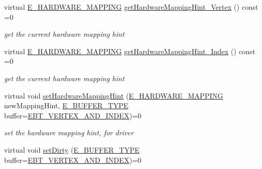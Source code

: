 \begin{DoxyCompactItemize}
virtual \hyperlink{namespaceirr_1_1scene_ac7d8ee8d77da75f2580bb9bb17231c27}{E\+\_\+\+H\+A\+R\+D\+W\+A\+R\+E\+\_\+\+M\+A\+P\+P\+I\+NG} \hyperlink{classirr_1_1scene_1_1IMeshBuffer_abbf42191b2fb4d2f7094a77fd76a530e}{get\+Hardware\+Mapping\+Hint\+\_\+\+Vertex} () const =0
\begin{DoxyCompactList}\small\item\em get the current hardware mapping hint \end{DoxyCompactList}\item 
\mbox{\label{classirr_1_1scene_1_1IMeshBuffer_a2260f9efb3fad4ba9581e18fccaad5a7}} 
virtual \hyperlink{namespaceirr_1_1scene_ac7d8ee8d77da75f2580bb9bb17231c27}{E\+\_\+\+H\+A\+R\+D\+W\+A\+R\+E\+\_\+\+M\+A\+P\+P\+I\+NG} \hyperlink{classirr_1_1scene_1_1IMeshBuffer_a2260f9efb3fad4ba9581e18fccaad5a7}{get\+Hardware\+Mapping\+Hint\+\_\+\+Index} () const =0
\begin{DoxyCompactList}\small\item\em get the current hardware mapping hint \end{DoxyCompactList}\item 
\mbox{\label{classirr_1_1scene_1_1IMeshBuffer_a133c2ee78c14db43e0fec3d3e300700a}} 
virtual void \hyperlink{classirr_1_1scene_1_1IMeshBuffer_a133c2ee78c14db43e0fec3d3e300700a}{set\+Hardware\+Mapping\+Hint} (\hyperlink{namespaceirr_1_1scene_ac7d8ee8d77da75f2580bb9bb17231c27}{E\+\_\+\+H\+A\+R\+D\+W\+A\+R\+E\+\_\+\+M\+A\+P\+P\+I\+NG} new\+Mapping\+Hint, \hyperlink{namespaceirr_1_1scene_a8f59a89ffef0ad8e5b2c2cb874a93e8c}{E\+\_\+\+B\+U\+F\+F\+E\+R\+\_\+\+T\+Y\+PE} buffer=\hyperlink{namespaceirr_1_1scene_a8f59a89ffef0ad8e5b2c2cb874a93e8ca34ea664123fbc28610408e51b014dcdd}{E\+B\+T\+\_\+\+V\+E\+R\+T\+E\+X\+\_\+\+A\+N\+D\+\_\+\+I\+N\+D\+EX})=0
\begin{DoxyCompactList}\small\item\em set the hardware mapping hint, for driver \end{DoxyCompactList}\item 
\mbox{\label{classirr_1_1scene_1_1IMeshBuffer_a21c9395d9751082ce3feecf33351f918}} 
virtual void \hyperlink{classirr_1_1scene_1_1IMeshBuffer_a21c9395d9751082ce3feecf33351f918}{set\+Dirty} (\hyperlink{namespaceirr_1_1scene_a8f59a89ffef0ad8e5b2c2cb874a93e8c}{E\+\_\+\+B\+U\+F\+F\+E\+R\+\_\+\+T\+Y\+PE} buffer=\hyperlink{namespaceirr_1_1scene_a8f59a89ffef0ad8e5b2c2cb874a93e8ca34ea664123fbc28610408e51b014dcdd}{E\+B\+T\+\_\+\+V\+E\+R\+T\+E\+X\+\_\+\+A\+N\+D\+\_\+\+I\+N\+D\+EX})=0

\end{DoxyCompactItemize}
